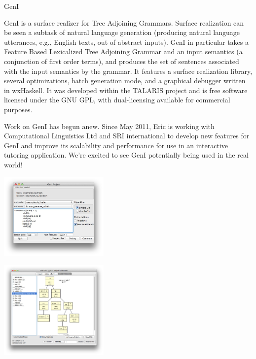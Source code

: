 \begin{hcarentry}{GenI}
\label{geni}
\makeheader

GenI is a surface realizer for Tree Adjoining Grammars.  Surface
realization can be seen a subtask of natural language generation
(producing natural language utterances, e.g., English texts, out of
abstract inputs).  GenI in particular takes a Feature Based
Lexicalized Tree Adjoining Grammar and an
input semantics (a conjunction of first order terms), and produces the
set of sentences associated with the input semantics by the grammar.  It
features a surface realization library, several optimizations, batch
generation mode, and a graphical debugger written in wxHaskell.  It was
developed within the TALARIS project and is free software licensed under
the GNU GPL, with dual-licensing available for commercial purposes.

Work on GenI has begun anew.  Since May 2011, Eric is working with
Computational Linguistics Ltd and SRI international to develop new
features for GenI and improve its scalability and performance for use in
an interactive tutoring application. We're excited to see GenI
potentially being used in the real world!

\begin{center}
\includegraphics[width=0.4\textwidth]{html/GenI-main-screenshot.jpg}
\end{center}

\begin{center}
\includegraphics[width=0.4\textwidth]{html/GenI-debugger-screenshot.jpg}
\end{center}


\end{hcarentry}
